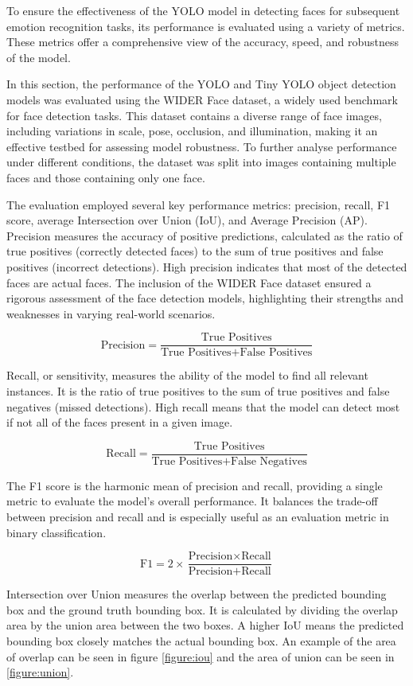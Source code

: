 To ensure the effectiveness of the YOLO model in detecting faces for subsequent emotion recognition tasks, its performance is evaluated using a variety of metrics. These metrics offer a comprehensive view of the accuracy, speed, and robustness of the model.

In this section, the performance of the YOLO and Tiny YOLO object detection models was evaluated using the WIDER Face dataset, a widely used benchmark for face detection tasks. This dataset contains a diverse range of face images, including variations in scale, pose, occlusion, and illumination, making it an effective testbed for assessing model robustness. To further analyse performance under different conditions, the dataset was split into images containing multiple faces and those containing only one face.

The evaluation employed several key performance metrics: precision, recall, F1 score, average Intersection over Union (IoU), and Average Precision (AP). Precision measures the accuracy of positive predictions, calculated as the ratio of true positives (correctly detected faces) to the sum of true positives and false positives (incorrect detections). High precision indicates that most of the detected faces are actual faces. The inclusion of the WIDER Face dataset ensured a rigorous assessment of the face detection models, highlighting their strengths and weaknesses in varying real-world scenarios.

\[
\text{Precision} = \frac{\text{True Positives}}{\text{True Positives} + \text{False Positives}}
\]

Recall, or sensitivity, measures the ability of the model to find all relevant instances. It is the ratio of true positives to the sum of true positives and false negatives (missed detections). High recall means that the model can detect most if not all of the faces present in a given image.

\[
\text{Recall} = \frac{\text{True Positives}}{\text{True Positives} + \text{False Negatives}}
\]

The F1 score is the harmonic mean of precision and recall, providing a single metric to evaluate the model's overall performance. It balances the trade-off between precision and recall and is especially useful as an evaluation metric in binary classification.

\[
\text{F1} = 2 \times \frac{\text{Precision} \times \text{Recall}}{\text{Precision} + \text{Recall}}
\]

Intersection over Union measures the overlap between the predicted bounding box and the ground truth bounding box. It is calculated by dividing the overlap area by the union area between the two boxes. A higher IoU means the predicted bounding box closely matches the actual bounding box. An example of the area of overlap can be seen in figure \ref{figure:iou} and the area of union can be seen in \ref{figure:union}.

